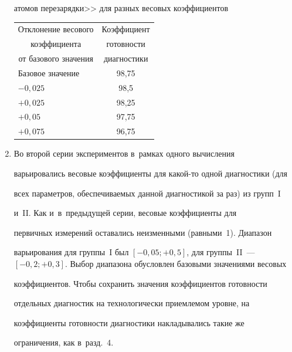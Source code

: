 \begin{enumerate}[1.]
\begin{table}
\begin{center}
{{атомов перезарядки>> для разных весовых коэффициентов }}


\vspace*{2ex}





\tabcolsep=15pt


\begin{tabular}{|l|c|}


\hline


\multicolumn{1}{|c|}{Отклонение весового}& Коэффициент\\


\multicolumn{1}{|c|}{коэффициента}&готовности\\


\multicolumn{1}{|c|}{от базового значения} & диагностики\\


\hline


Базовое значение&98,75\\


$-0{,}025$&98,5\hphantom{5}\\


$+0{,}025$&98,25\\


$+0{,}05$&97,75\\


$+0{,}075$&96,75\\


\hline


\end{tabular}


\end{center}


\vspace*{-3pt}


\end{table}





\item  Во второй серии экспериментов в~рамках одного вычисления 


варьировались весовые коэффициенты для ка\-кой-то одной диагностики (для 


всех па\-ра\-мет\-ров, обеспечиваемых данной диагностикой за раз) из групп~I 


и~II. Как и~в~предыду\-щей серии, весовые коэффициенты для 


первичных измерений оставались неизменными (равными~1). Диапазон 


варьирования для группы~I был $[-0{,}05; +0{,}5]$, для группы~II~--- $[-


0{,}2; +0{,}3]$. Выбор диапазона обусловлен базовыми значениями весовых 


коэффициентов. Чтобы сохранить значения коэффициентов готовности 


отдельных диагностик на технологически приемлемом уровне, на 


коэффициенты го\-тов\-ности диагностики накладывались такие же 


ограничения, как в~разд.~4.


\end{enumerate}
